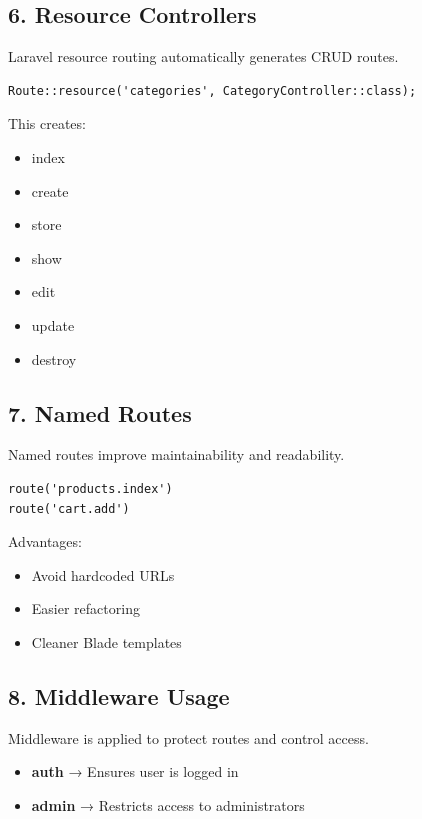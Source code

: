 \documentclass[12pt,a4paper]{article}
\begin{document}
\subsection{6. Resource Controllers}

Laravel resource routing automatically generates CRUD routes.

\begin{verbatim}
Route::resource('categories', CategoryController::class);
\end{verbatim}

This creates:
\begin{itemize}[noitemsep]
    \item index
    \item create
    \item store
    \item show
    \item edit
    \item update
    \item destroy
\end{itemize}

\subsection{7. Named Routes}

Named routes improve maintainability and readability.

\begin{verbatim}
route('products.index')
route('cart.add')
\end{verbatim}

Advantages:
\begin{itemize}[noitemsep]
    \item Avoid hardcoded URLs
    \item Easier refactoring
    \item Cleaner Blade templates
\end{itemize}

\subsection{8. Middleware Usage}

Middleware is applied to protect routes and control access.

\begin{itemize}[noitemsep]
    \item \textbf{auth} → Ensures user is logged in
    \item \textbf{admin} → Restricts access to administrators
\end{itemize}
\end{document}
